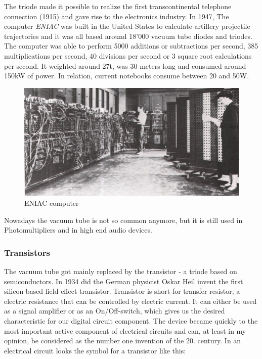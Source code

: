 \documentclass[11pt]{article}
\begin{document}
The triode made it possible to realize the first transcontinental telephone connection (1915) and gave rise to the electronics industry. In 1947, The computer \textit{ENIAC} was built in the United States to calculate artillery projectile trajectories and it was all based around 18'000 vacuum tube diodes and triodes. The computer was able to perform 5000 additions or subtractions per second, 385 multiplications per second, 40 divisions per second or 3 square root calculations per second. It weighted around 27t, was 30 meters long and consumed around 150kW of power. In relation, current notebooks consume between 20 and 50W. 
\begin{figure}[H]
\centering
\includegraphics[width=1\textwidth]{eniac}%
\caption{ENIAC computer}
\label{fig:eniac}
\end{figure}

Nowadays the vacuum tube is not so common anymore, but it is still used in Photomultipliers and in high end audio devices.

\subsubsection{Transistors}
The vacuum tube got mainly replaced by the transistor - a triode based on semiconductors. In 1934 did the German physicist Oskar Heil invent the first silicon based field effect transistor. Transistor is short for transfer resistor; a electric resistance that can be controlled by electric current. It can either be used as a signal amplifier or as an On/Off-switch, which gives us the desired characteristic for our digital circuit component. The device became quickly to the most important active component of electrical circuits and can, at least in my opinion, be considered as the number one invention of the 20. century. In an electrical circuit looks the symbol for a transistor like this:
\end{document}
